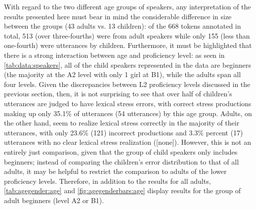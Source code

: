 			
			
			

				With regard to the two different age groups of speakers, any interpretation of the results presented here must bear in mind the considerable difference in size between the groups (43 adults vs. 13 children): of the 668 tokens annotated in total, 513 (over three-fourths) were from adult speakers while only 155 (less than one-fourth) were utterances by children. Furthermore, it must be highlighted that there is a strong interaction between age and proficiency level: as seen in \cref{tab:data:speakers}, all of the child speakers 
				represented in the data 
				are beginners 
				(the majority at the A2 level with only 1 girl at B1),
				while the adults span all four levels. Given the discrepancies between L2 proficiency levels discussed in the previous section, then, it is not surprising to see that over half of children's utterances are judged to have lexical stress errors, with correct stress productions making up only 35.1\% of utterances (54 utterances) by this age group. Adults, on the other hand, seem to realize lexical stress correctly in the majority of their utterances, with only 23.6\% (121) incorrect productions and 3.3\% percent (17) utterances with no clear lexical stress realization ([none]). However, this is not an entirely just comparison, given that the group of child speakers only includes beginners; instead of comparing the children's error distribution to that of all adults, it may be helpful to restrict the comparison to adults of the lower proficiency levels. 
				Therefore, in addition to the results for all adults, \cref{tab:agegender:age} and \cref{fig:agegenderbars:age} display results for the group of adult beginners (level A2 or B1).
				
